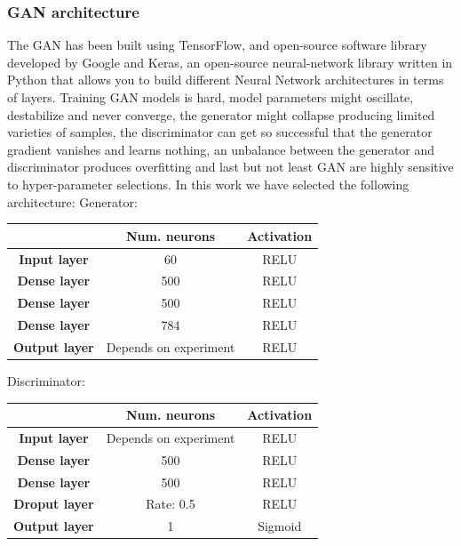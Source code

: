 \documentclass[a4paper,fleqn]{cas-dc}
\begin{document}
\subsubsection{GAN architecture}
The GAN has been built using TensorFlow, and open-source software library developed by Google and Keras, an open-source neural-network library written in Python that allows you to build different Neural Network architectures in terms of layers.
Training GAN models is hard, model parameters might oscillate,  destabilize and never converge,
the generator might collapse producing limited varieties of samples, the discriminator can get so successful that the generator gradient vanishes and learns nothing, an unbalance between the generator and discriminator produces overfitting and last but not least GAN are highly sensitive to hyper-parameter selections. In this work we have selected the following architecture:
\newline
\newline
Generator:
\newline
\newline
\begin{tabular}{ |c|c|c|  } 
	\hline
	 & Num. neurons & Activation \\
	 \hline
	\textbf{Input layer} & 60 & RELU \\
	\hline
	\textbf{Dense layer} & 500 & RELU \\
	\hline
	\textbf{Dense layer} & 500 & RELU \\
	\hline
	\textbf{Dense layer} & 784 & RELU \\
	\hline
	\textbf{Output layer} & Depends on experiment & RELU \\
	\hline	
\end{tabular}
\medskip
\newline
\newline
\newline
Discriminator:
\newline
\newline
\begin{tabular}{ |c|c|c|  } 
	\hline
	& Num. neurons & Activation \\
	\hline
	\textbf{Input layer} & Depends on experiment & RELU \\
	\hline
	\textbf{Dense layer} & 500 & RELU \\
	\hline
	\textbf{Dense layer} & 500 & RELU \\
	\hline
	\textbf{Droput layer} & Rate: 0.5 & RELU \\
	\hline
	\textbf{Output layer} & 1 & Sigmoid \\
	\hline
	
\end{tabular}
\end{document}
